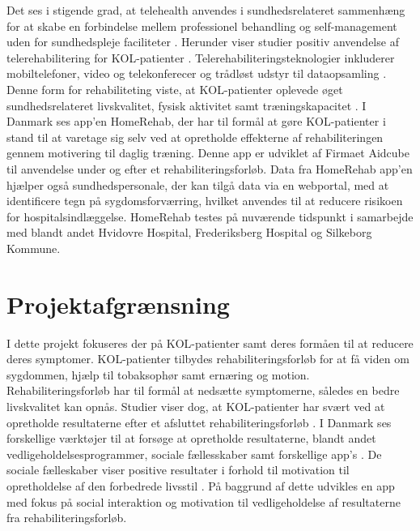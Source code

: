 Det ses i stigende grad, at telehealth anvendes i sundhedsrelateret sammenhæng for at skabe en forbindelse mellem professionel behandling og self-management uden for sundhedspleje faciliteter \cite{Williams2014,WHOtelehealth2017}. Herunder viser studier positiv anvendelse af telerehabilitering for KOL-patienter \cite{Zanaboni2017}. Telerehabiliteringsteknologier inkluderer mobiltelefoner, video og telekonferecer og trådløst udstyr til dataopsamling \cite{WHOrehab2017,Zanaboni2017}. Denne form for rehabiliteting viste, at KOL-patienter oplevede øget sundhedsrelateret livskvalitet, fysisk aktivitet samt træningskapacitet \cite{Zanaboni2017}.
I Danmark ses app'en HomeRehab, der har til formål at gøre KOL-patienter i stand til at varetage sig selv ved at opretholde effekterne af rehabiliteringen gennem motivering til daglig træning. Denne app er udviklet af Firmaet Aidcube til anvendelse under og efter et rehabiliteringsforløb. Data fra HomeRehab app'en hjælper også sundhedspersonale, der kan tilgå data via en webportal, med at identificere tegn på sygdomsforværring, hvilket anvendes til at reducere risikoen for hospitalsindlæggelse. HomeRehab testes på nuværende tidspunkt i samarbejde med blandt andet Hvidovre Hospital, Frederiksberg Hospital og Silkeborg Kommune.\cite{HealthcareDenmark2017} 

\section{Projektafgrænsning}
I dette projekt fokuseres der på KOL-patienter samt deres formåen til at reducere deres symptomer. KOL-patienter tilbydes rehabiliteringsforløb for at få viden om sygdommen, hjælp til tobaksophør samt ernæring og motion. Rehabiliteringsforløb har til formål at nedsætte symptomerne, således en bedre livskvalitet kan opnås.\cite{McCarthy2015,Lungeforeningen2016,Habraken2011,Sundhedsstyrelsen2015} Studier viser dog, at KOL-patienter har svært ved at opretholde resultaterne efter et afsluttet rehabiliteringsforløb \cite{Egan2012,Beachamp2013,Zanaboni2017,Ringbaek2008}. I Danmark ses forskellige værktøjer til at forsøge at opretholde resultaterne, blandt andet vedligeholdelsesprogrammer, sociale fællesskaber samt forskellige app's \cite{Sundhedsstyrelsen2015,HealthcareDenmark2017}. De sociale fælleskaber viser positive resultater i forhold til motivation til opretholdelse af den forbedrede livsstil \cite{dsam2016}.
På baggrund af dette udvikles en app med fokus på social interaktion og motivation til vedligeholdelse af resultaterne fra rehabiliteringsforløb. 
